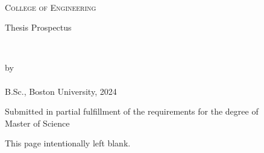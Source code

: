 
\begin{titlepage}
    \begin{center}
        \begin{doublespace}
             \\
            \textsc{\Large College of Engineering} \\
        \end{doublespace}
        \vfill
        {\large Thesis Prospectus}\\
        \vfill
        \begin{spacing}{1.5}
            \textbf{\textsc{\huge\thesisName}} \\
        \end{spacing}
        \vfill
        by \\
        \vfill
        \textbf{\LARGE\authorName} \\ \vspace{2.5pt}
        {\Large B.Sc., Boston University, 2024} \\
        \vfill
        \begin{doublespace}
            Submitted in partial fulfillment of the requirements for the degree of\\
            Master of Science\\
            \the\year
        \end{doublespace}
    \end{center}
\end{titlepage}

\newpage
\pagestyle{empty}
    \begin{center}
        This page intentionally left blank.
    \end{center}
    \cleardoublepage
\pagestyle{plain}

\setcounter{page}{1}
    \tableofcontents
\cleardoublepage

\setcounter{page}{1}
